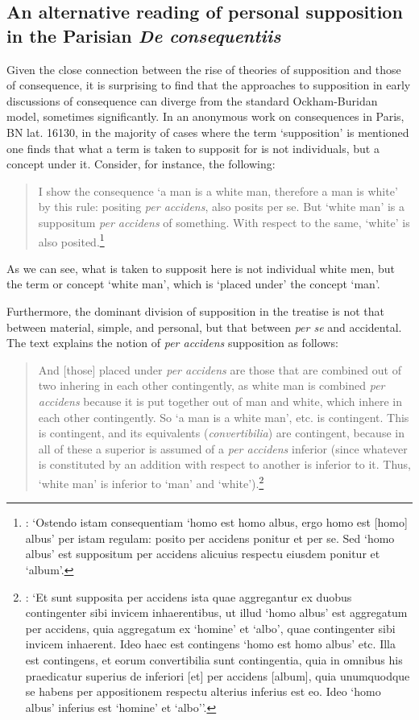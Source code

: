\documentclass[a4paper, 11pt]{article}
\begin{document}
\subsection{An alternative reading of personal supposition in the Parisian \emph{De consequentiis}}
Given the close connection between the rise of theories of supposition and those of consequence, it is surprising to find that the approaches to supposition in early discussions of consequence can diverge from the standard Ockham-Buridan model, sometimes significantly. In an anonymous work on consequences in Paris, BN lat. 16130, in the majority of cases where the term `supposition' is mentioned one finds that what a term is taken to supposit for is not individuals, but a concept under it. Consider, for instance, the following:

\begin{quote}
I show the consequence `a man is a white man, therefore a man is white' by this rule: positing \emph{per accidens}, also posits per se. But `white man' is a suppositum \emph{per accidens} of something. With respect to the same, `white' is also posited.\footnote{\autocite[18, par. 34]{Green-Pedersen1980a}: `Ostendo istam consequentiam `homo est homo albus, ergo homo est [homo] albus' per istam regulam: posito per accidens ponitur et per se. Sed `homo albus' est suppositum per accidens alicuius respectu eiusdem ponitur et `album'.}
\end{quote}

As we can see, what is taken to supposit here is not individual white men, but the term or concept `white man', which is `placed under' the concept `man'. 

Furthermore, the dominant division of supposition in the treatise is not that between material, simple, and personal, but that between \emph{per se} and accidental. The text explains the notion of \emph{per accidens} supposition as follows:

\begin{quote}
And [those] placed under \emph{per accidens} are those that are combined out of two inhering in each other contingently, as white man is combined \emph{per accidens} because it is put together out of man and white, which inhere in each other contingently. So `a man is a white man', etc. is contingent. This is contingent, and its equivalents (\emph{convertibilia}) are contingent, because in all of these a superior is assumed of a \emph{per accidens} inferior (since whatever is constituted by an addition with respect to another is inferior to it. Thus, `white man' is inferior to `man' and `white').\footnote{\autocite[19, par. 38]{Green-Pedersen1980a}: `Et sunt supposita per accidens ista quae aggregantur ex duobus contingenter sibi invicem inhaerentibus, ut illud `homo albus' est aggregatum per accidens, quia aggregatum ex `homine' et `albo', quae contingenter sibi invicem inhaerent. Ideo haec est contingens `homo est homo albus' etc. Illa est contingens, et eorum convertibilia sunt contingentia, quia in omnibus his praedicatur superius de inferiori [et] per accidens [album], quia unumquodque se habens per appositionem respectu alterius inferius est eo. Ideo `homo albus' inferius est `homine' et `albo''.}
\end{quote}
\end{document}
